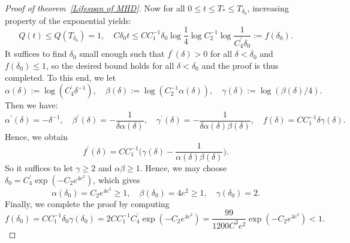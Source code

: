 \documentclass[12pt,letterpaper]{article}
\theoremstyle{plain}
\begin{document}
\begin{proof}[Proof of theorem~\ref{Lifespan of MHD}]
Now for all $0\le t\le T_*\le T_{\delta_0}$, increasing property of the exponential yields:
\begin{equation*}
 Q(t)\le    Q(T_{\delta_0})=1,\quad C\delta_0 t\le CC_1^{-1}\delta_0\log \frac{1}{4}\log C_2^{-1}\log\frac{1}{C_4^\prime\delta_0}:=f(\delta_0).
\end{equation*}
It suffices to find $\delta_0$ small enough such that $f^\prime(\delta)>0$ for all $\delta<\delta_0$ and $f(\delta_0)\le 1$, so the desired bound holds for all $\delta<\delta_0$ and the proof is thus completed. To this end, we let
\begin{equation*}
 \alpha(\delta):=\log(C_4^\prime\delta^{-1}),\quad \beta(\delta):= \log (C_2^{-1}\alpha(\delta)) ,\quad \gamma(\delta):= \log (\beta(\delta)/4).
\end{equation*}
Then we have:
\begin{equation*}
 \alpha^\prime(\delta)=- \delta^{-1},\quad \beta^\prime(\delta)=-\frac{1}{\delta\alpha(\delta)},\quad \gamma^\prime(\delta)=-\frac{1}{\delta\alpha(\delta)\beta(\delta)},\quad f(\delta)= CC_1^{-1}\delta\gamma(\delta).
\end{equation*}
Hence, we obtain
\begin{equation*}
 f^\prime(\delta)= CC_1^{-1}\bigg(\gamma(\delta)-\frac{1}{\alpha(\delta)\beta(\delta)} \bigg) .
\end{equation*}
So it suffices to let $\gamma\ge 2$ and $\alpha\beta\ge 1$. Hence, we may choose $\delta_0=C_4^\prime\exp(-C_2e^{4e^2})$, which gives
\begin{equation*}
\alpha(\delta_0)=C_2e^{4e^2}\ge 1,\quad \beta(\delta_0)= 4e^2\ge 1,\quad \gamma(\delta_0)=2.   \end{equation*}
Finally, we complete the proof by computing
\begin{equation*}
 f(\delta_0)=CC_1^{-1}\delta_0\gamma(\delta_0)=2CC_1^{-1}C_4^\prime\exp(-C_2e^{4e^2})=\frac{99}{1200 C^3e^2}\exp(-C_2e^{4e^2})< 1.  
\end{equation*}

\end{proof}




\end{document}

